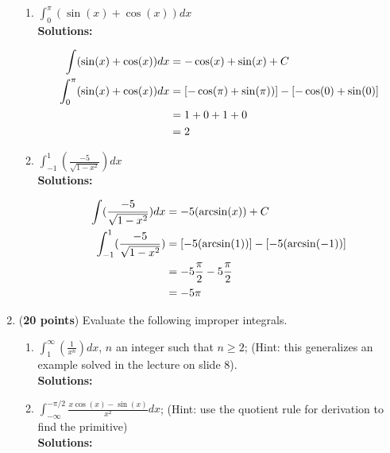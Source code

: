 \documentclass[a4paper]{article}
\begin{document}
\begin{enumerate}
\begin{enumerate}
	
	\item $\int_{0}^\pi(\sin(x) + \cos(x))dx$\\
	
	\textbf{Solutions:}	

\begin{align}
	\int(\sin(x) + \cos(x))dx &= -\cos(x) + \sin(x) + C\notag\\
	\int_{0}^\pi(\sin(x) + \cos(x))dx &= \left[ -\cos(\pi) + \sin(\pi))\right] - \left[ -\cos(0) + \sin(0)\right]\notag\\
	&= 1 + 0 + 1 + 0\notag\\
	&= 2\notag
\end{align}		




	\item $\int_{-1}^1(\frac{-5}{\sqrt{1 - x^2}})dx$\\
	
	\textbf{Solutions:}	

\begin{align}
	\int(\frac{-5}{\sqrt{1 - x^2}})dx &= -5(\arcsin(x)) + C\notag\\
	\int_{-1}^1(\frac{-5}{\sqrt{1 - x^2}}) &= \left[ -5(\arcsin(1)) \right] - \left[ -5(\arcsin(-1))\right]\notag\\
	&= -5\frac{\pi}{2} - 5\frac{\pi}{2}\notag\\
	&= -5\pi\notag
\end{align}	



\end{enumerate}


\item (\textbf{20 points}) Evaluate the following improper integrals.

\begin{enumerate}
	\item $\int_{1}^\infty (\frac{1}{x^n})dx$, $n$ an integer such that $n \geq 2$; (Hint: this generalizes an example solved in the lecture on slide 8).\\
	\textbf{Solutions:}	
	
	
	
	
	\item $\int_{-\infty}^{-\pi/2}\frac{x \cos(x) - \sin(x)}{x^2}dx$; (Hint: use the quotient rule for derivation to find the primitive)\\
	\textbf{Solutions:}	


\end{enumerate}
\end{enumerate}
\end{document}
